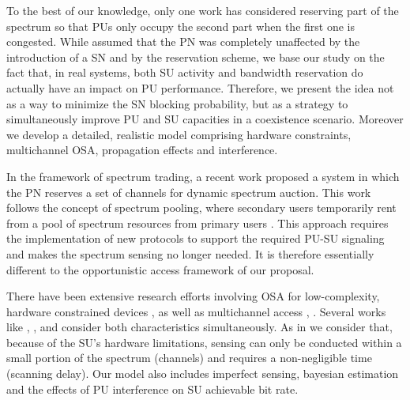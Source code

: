 To the best of our knowledge, only one work \cite{ref:Reservation4} has considered reserving part of the spectrum so that PUs only occupy the second part when the first one is congested.
While \cite{ref:Reservation4} assumed that the PN was completely unaffected by the introduction of a SN and by the reservation scheme, we base our study on the fact that, in real systems, both SU activity and bandwidth reservation do actually have an impact on PU performance. Therefore, we present the idea not as a way to minimize the SN blocking probability, but as a strategy to simultaneously improve PU and SU capacities in a coexistence scenario. Moreover we develop a detailed, realistic model comprising hardware constraints, multichannel OSA, propagation effects and interference.

In the framework of spectrum trading, a recent work \cite{ref:Reservation5} proposed a system in which the PN reserves a set of channels for dynamic spectrum auction. This work follows the concept of spectrum pooling, where secondary users temporarily rent from a pool of spectrum resources from primary users \cite{ref:BookCognitive}. This approach requires the implementation of new protocols to support the required PU-SU signaling and makes the spectrum sensing no longer needed. It is therefore essentially different to the opportunistic access framework of our proposal.

There have been extensive research efforts involving OSA for low-complexity, hardware constrained devices \cite{ref:SensingMultichannel}, \cite{ref:lowComplexity} as well as multichannel access \cite{ref:MultichannelMAC}, \cite{ref:MultichannelMAC2}. 
Several works like \cite{ref:HCMAC}, \cite{ref:DiscoveringOpportunities}, \cite{ref:MultichannelMultistage} and \cite{ref:StoppingRule} consider both characteristics simultaneously. As in \cite{ref:HCMAC} we consider that, because of the SU's hardware limitations, sensing can only be conducted within a small portion of the spectrum (channels) and requires a non-negligible time (scanning delay). Our model also includes imperfect sensing, bayesian estimation and the effects of PU interference on SU achievable bit rate.  


